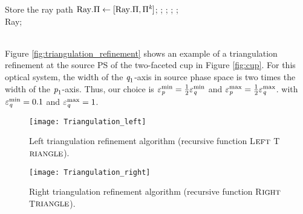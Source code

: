 \begin{algorithm}[h]
\begin{algorithmic}[1]
\State Store the ray path $\mbox{Ray}.\Pi\gets [\mbox{Ray}.\Pi, \Pi^{\textit{k}}]$;
\EndIf
\EndFor
\State{};
\State{};
\State{};
\State{};
\EndIf \\
\Return Ray;
\EndProcedure
\end{algorithmic}
\end{algorithm}
\\ \indent Figure \ref{fig:triangulation_refinement} shows an example of a triangulation refinement at the source PS of the two-faceted cup in Figure \ref{fig:cup}. 
For this optical system, the width of the $\textit{q}_1$-axis in source phase space is two times the width of the $\textit{p}_1$-axis.
Thus, our choice is $\varepsilon_{\textit{p}}^{\textrm{min}}=\frac{1}{2}\varepsilon_{\textit{q}}^{\textrm{min}}$ and $\varepsilon_{\textit{p}}^{\textrm{max}} = \frac{1}{2}\varepsilon_{\textit{q}}^{\textrm{max}}$.
with $\varepsilon_{\textit{q}}^{\textrm{min}}=0.1$ and $\varepsilon_{\textit{q}}^{\textrm{max}}=1$.
 \begin{figure}[h]
 \begin{minipage}[t]{0.48\textwidth}
\centering
    \texttt{[image: Triangulation\_left]}
    \caption{Left triangulation refinement algorithm (recursive function L$\footnotesize{\textrm{EFT}}$ T$\footnotesize{\textrm{RIANGLE}}$).}
    \label{fig:triangulation_left}
\end{minipage}
\hfill
\begin{minipage}[t]{0.48\textwidth}
\centering
    \texttt{[image: Triangulation\_right]}
    \caption{Right triangulation refinement algorithm (recursive function R$\footnotesize{\textrm{IGHT}}$ T$\footnotesize{\textrm{RIANGLE}}$).}
    \label{fig:triangulation_right}
\end{minipage}
\end{figure}
